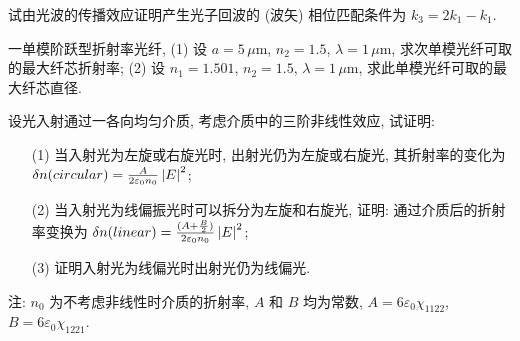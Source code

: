 \documentclass{assignment}
\begin{document}
\begin{prob}
    试由光波的传播效应证明产生光子回波的 (波矢) 相位匹配条件为 $k_3=2k_1-k_1$.
\end{prob}
\begin{pf}

\end{pf}

\begin{prob}
    一单模阶跃型折射率光纤, (1) 设 $a=5\,\mu$m, $n_2=1.5$, $\lambda=1\,\mu$m, 求次单模光纤可取的最大纤芯折射率; (2) 设 $n_1=1.501$, $n_2=1.5$, $\lambda=1\,\mu$m, 求此单模光纤可取的最大纤芯直径.
\end{prob}
\begin{sol}
    
\end{sol}

\begin{prob}
    设光入射通过一各向均匀介质, 考虑介质中的三阶非线性效应, 试证明:
    \begin{itemize}
        \item[(1)] 当入射光为左旋或右旋光时, 出射光仍为左旋或右旋光, 其折射率的变化为 $\delta n(circular)=\frac{A}{2\varepsilon_0n_0}\left\lvert E\right\rvert^2$;
        \item[(2)] 当入射光为线偏振光时可以拆分为左旋和右旋光, 证明: 通过介质后的折射率变换为 $\delta n(linear)=\frac{(A+\frac{B}{2})}{2\varepsilon_0n_0}\left\lvert E\right\rvert^2$;
        \item[(3)] 证明入射光为线偏光时出射光仍为线偏光.
    \end{itemize}
    注: $n_0$ 为不考虑非线性时介质的折射率, $A$ 和 $B$ 均为常数, $A=6\varepsilon_0\chi_{1122}$, $B=6\varepsilon_0\chi_{1221}$.
\end{prob}
\begin{pf}

\end{pf}
\end{document}
